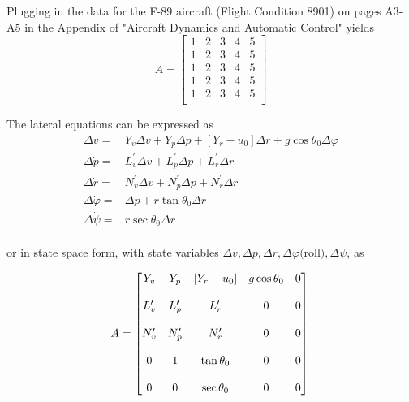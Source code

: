 \documentclass[12pt]{article}
\begin{document}
\noindent Plugging in the data for the F-89 aircraft (Flight Condition 8901) on pages A3-A5 in the Appendix of "Aircraft Dynamics and Automatic Control" yields
\begin{equation*}
A =
\begin{bmatrix}
    1 & 2 & 3 & 4 & 5 \\
    1 & 2 & 3 & 4 & 5 \\
    1 & 2 & 3 & 4 & 5 \\
    1 & 2 & 3 & 4 & 5 \\
    1 & 2 & 3 & 4 & 5 \\
\end{bmatrix}
\end{equation*}

\noindent The lateral equations can be expressed as
\begin{equation*}
\begin{split}
\Delta \dot{v} = & Y_v\Delta v + Y_p\Delta p + \left[ Y_r - u_0 \right]\Delta r + g\cos\theta_0\Delta \varphi \\
\Delta \dot{p} = & L_v^\prime \Delta v + L_p^\prime \Delta p + L_r^\prime \Delta r\\
\Delta \dot{r} = & N_v^\prime \Delta v + N_p^\prime \Delta p + N_r^\prime \Delta r\\
\Delta \dot{\varphi} = &\Delta p + r\tan\theta_0\Delta r\\
\Delta \dot{\psi} = &r\sec\theta_0\Delta r\\
\end{split}
\end{equation*}


\noindent or in state space form, with state variables $\Delta v, \Delta p, \Delta r, \Delta \varphi \mbox{(roll)}, \Delta \psi $, as

\begin{equation*}
A =
\begin{bmatrix}
    Y_v & Y_p & \left[ Y_r-u_0 \right] & g\cos \theta_0 & 0 \\
    \\
    L_v^\prime & L_p^\prime & L_r^\prime & 0 & 0 \\
    \\
    N_v^\prime & N_p^\prime & N_r^\prime & 0 & 0 \\
    \\
    0 & 1 & \tan \theta_0 & 0 & 0 \\
    \\
    0 & 0 & \sec \theta_0 & 0 & 0
\end{bmatrix}\\
\end{equation*}
\end{document}
